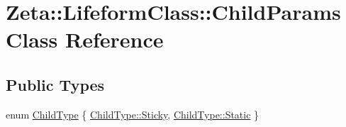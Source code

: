 \hypertarget{classZeta_1_1LifeformClass_1_1ChildParams}{\section{Zeta\+:\+:Lifeform\+Class\+:\+:Child\+Params Class Reference}
\label{classZeta_1_1LifeformClass_1_1ChildParams}
}
\subsection*{Public Types}
\begin{DoxyCompactItemize}
\item 
enum \hyperlink{classZeta_1_1LifeformClass_1_1ChildParams_aad6ee0ed3431ee2d31268a851fb09bdc}{Child\+Type} \{ \hyperlink{classZeta_1_1LifeformClass_1_1ChildParams_aad6ee0ed3431ee2d31268a851fb09bdcad8f6d391ba573fe747a3360afb99904d}{Child\+Type\+::\+Sticky}, 
\hyperlink{classZeta_1_1LifeformClass_1_1ChildParams_aad6ee0ed3431ee2d31268a851fb09bdca84a8921b25f505d0d2077aeb5db4bc16}{Child\+Type\+::\+Static}
 \}
\end{DoxyCompactItemize}
